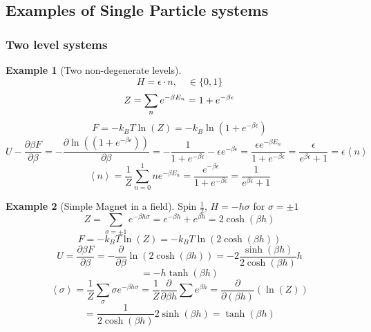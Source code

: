 \documentclass[11pt]{book}
\theoremstyle{definition}
\newtheorem{example}{Example}[section]
\begin{document}
\subsection{Examples of Single Particle systems}
\subsubsection{Two level systems}
\begin{example}[Two non-degenerate levels]
\[ H = \epsilon \cdot n, \quad  \in \{0,1\} \] 
\[ Z = \sum_n e^{-\beta E_n} = 1+e^{-\beta \epsilon }  \] 
\[ F = -k_BT \ln(Z) = - k_B \ln(1+e^{-\beta \epsilon})  \] 
\[ U - \frac{\partial \beta F}{\partial \beta} = - \frac{\partial \ln((1+e^{-\beta \epsilon})) }{\partial \beta} = 
-\frac{1}{1+e^{-\beta \epsilon}} - \epsilon e^{-\beta \epsilon} 
= \frac{ \epsilon e^{-\beta E_n}}{1+e^{-\beta \epsilon}}
= \frac{ \epsilon }{e^{\beta \epsilon} + 1} = \epsilon\left \langle n \right \rangle \] 
\[ \left \langle n \right \rangle = \frac{1}{Z} \sum_{n=0}^{1} n e^{-\beta E_n} = \frac{e^{-\beta \epsilon}}{1+e^{-\beta \epsilon} }
= \frac{1}{e^{\beta \epsilon} + 1}\] 
\end{example}

\begin{example}[Simple Magnet in a field]
Spin $ \frac{1}{2} $, $ H = -h \sigma  $  for $ \sigma = \pm 1 $ 
\[ Z = \sum_{\sigma = \pm 1} e^{-\beta h \sigma} = e^{-\beta h} + e^{\beta h} = 2 \cosh(\beta h)\] 
\[ F = -k_BT\ln(Z) = -k_BT\ln(2\cosh(\beta h))  \] 
\[ U = \frac{\partial \beta F}{\partial \beta } =
-\frac{\partial }{\partial \beta} \ln(2\cosh(\beta h)) = -2\frac{\sinh(\beta h)}{2\cosh(\beta h)} h\] 
\[ = -h \tanh(\beta h) \] 
\[ \left \langle \sigma \right \rangle = \frac{1}{Z} \sum_{\sigma} \sigma e^{-\beta h \sigma} = \frac{1}{Z} \frac{\partial }{\partial \beta h} \sum e^{\beta h} = \frac{\partial }{\partial (\beta h)}(\ln(Z) ) \] \[ = \frac{1}{2\cosh(\beta h)} 2\sinh(\beta h) = \tanh(\beta h) \] 


\begin{figure}	
\begin{center}
\end{center}
\end{figure}

\end{example}
\end{document}
